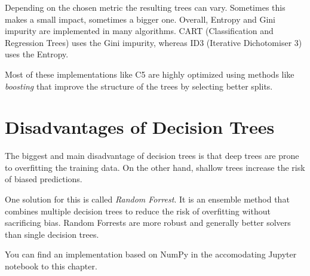 Depending on the chosen metric the resulting trees can vary. Sometimes this makes a small impact,
sometimes a bigger one. Overall, Entropy and Gini impurity are implemented in many algorithms.
CART (Classification and Regression Trees) uses the Gini impurity, whereas ID3 (Iterative Dichotomiser 3) uses the Entropy.

Most of these implementations like C5 are highly optimized using methods like \textit{boosting}
 that improve the structure of the trees by selecting better splits.

\section{Disadvantages of Decision Trees}
The biggest and main disadvantage of decision trees is that deep trees are prone to overfitting the training data. On the other hand, shallow trees increase the risk of biased predictions.

One solution for this is called \textit{Random Forrest}. It is an ensemble method that combines multiple decision trees to reduce the risk of overfitting without sacrificing bias.
Random Forrests are more robust and generally better solvers than single decision trees.

You can find an implementation based on NumPy in the accomodating Jupyter notebook to this chapter.
